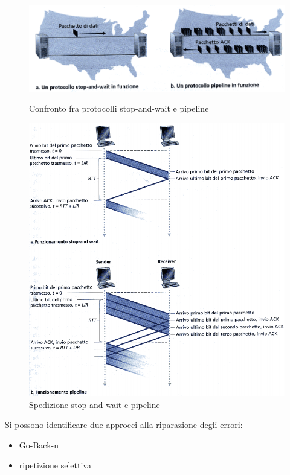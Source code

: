 \documentclass[11pt,a4paper]{book}
\begin{document}
\begin{figure}
	\begin{center}
		\includegraphics[scale=0.6]{img/023.png}
		\caption{Confronto fra protocolli stop-and-wait e pipeline}
		\includegraphics[scale=0.6]{img/024.png}
		\caption{Spedizione stop-and-wait e pipeline}
	\end{center}
\end{figure}
Si possono identificare due approcci alla riparazione degli errori:
\begin{itemize}
	\item Go-Back-n
	\item ripetizione selettiva
\end{itemize}
\end{document}
